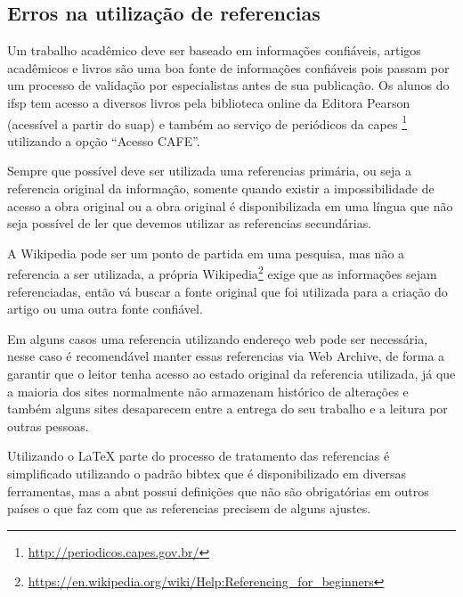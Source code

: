 \subsection{Erros na utilização de referencias}
\label{erros-referencias}

Um trabalho acadêmico deve ser baseado em informações confiáveis, artigos acadêmicos e livros são uma boa fonte de informações confiáveis pois passam por um processo de validação por especialistas antes de sua publicação. Os alunos do \ac{ifsp} tem acesso a diversos livros pela biblioteca online da Editora  Pearson (acessível a partir do \ac{suap}) e também ao serviço de periódicos da \ac{capes} \footnote{\url{http://periodicos.capes.gov.br/}} utilizando a opção \enquote{Acesso CAFE}.

Sempre que possível deve ser utilizada uma referencias primária, ou seja a referencia original da informação, somente quando existir a impossibilidade de acesso a obra original ou a obra original é disponibilizada em uma língua que não seja possível de ler que devemos utilizar as referencias secundárias.

A Wikipedia pode ser um ponto de partida em uma pesquisa, mas não a referencia a ser utilizada, a própria Wikipedia\footnote{\url{https://en.wikipedia.org/wiki/Help:Referencing_for_beginners}} exige que as informações sejam referenciadas, então vá buscar a fonte original que foi utilizada para a criação do artigo ou uma outra fonte confiável.

Em alguns casos uma referencia utilizando endereço web pode ser necessária, nesse caso é recomendável manter essas referencias via  Web Archive, de forma a garantir que o leitor tenha acesso ao estado original da referencia utilizada, já que a maioria dos sites normalmente não armazenam histórico de alterações e também alguns sites desaparecem entre a entrega do seu trabalho e a leitura por outras pessoas.

Utilizando o {\LaTeX} parte do processo de tratamento das referencias é simplificado utilizando o padrão bibtex que é disponibilizado em diversas ferramentas, mas a \ac{abnt} possui definições que não são obrigatórias em outros países o que faz com que as referencias precisem de alguns ajustes.


